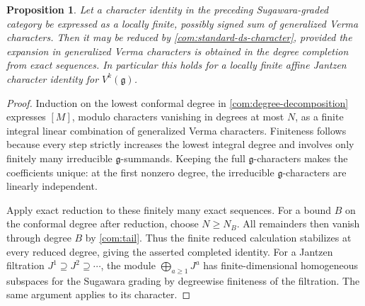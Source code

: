 \documentclass[11pt,a4paper]{amsart}
\numberwithin{equation}{section}
\newtheorem{proposition}[theorem]{Proposition}
\theoremstyle{definition}
\theoremstyle{remark}
\newcommand{\g}{\mathfrak g}
\begin{document}
\begin{proposition}
\label{com:completion}
Let a character identity in the preceding Sugawara-graded category
be expressed as a locally finite, possibly signed sum of generalized Verma
characters. Then it may be reduced by
\eqref{com:standard-ds-character}, provided the expansion in generalized Verma characters
is obtained in the degree completion from exact sequences.
In particular this holds for a locally finite affine Jantzen
character identity for $V^k(\g)$.
\end{proposition}
\begin{proof}
Induction on the lowest conformal degree in
\eqref{com:degree-decomposition} expresses $[M]$, modulo characters
vanishing in degrees at most $N$, as a finite integral linear combination
of generalized Verma characters. Finiteness follows because every step strictly
increases the lowest integral degree and involves only finitely many
irreducible $\g$-summands. Keeping the full $\g$-characters makes the coefficients unique: at the first nonzero degree, the irreducible
$\g$-characters are linearly independent.

Apply exact reduction to these finitely many exact sequences.
For a bound $B$ on the conformal degree after reduction, choose $N\ge N_B$. All remainders then
vanish through degree $B$ by \cref{com:tail}. Thus the finite reduced
calculation stabilizes at every reduced degree, giving the asserted
completed identity. For a Jantzen filtration $J^1\supseteq J^2
\supseteq\cdots$, the module $\bigoplus_{a\ge1}J^a$ has
finite-dimensional homogeneous subspaces for the Sugawara grading by degreewise finiteness
of the filtration. The same argument applies to its character.
\end{proof}
\end{document}
